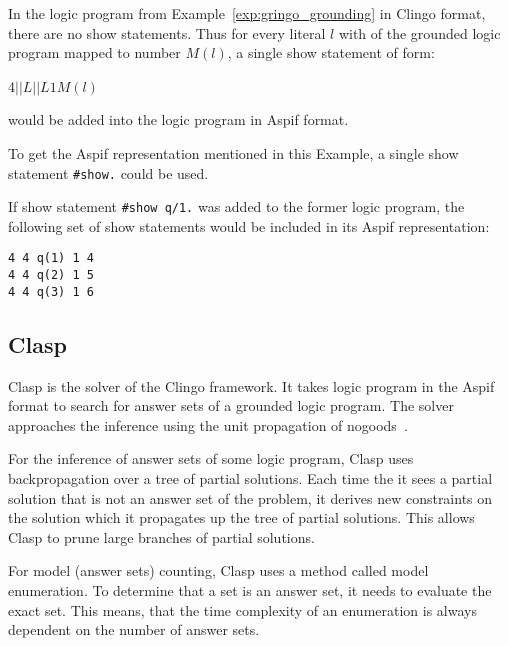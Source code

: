 \begin{example}
    In the logic program from Example~\ref{exp:gringo_grounding} in Clingo format,
    there are no show statements. Thus for every literal $l$ with of the grounded
    logic program mapped to number $M(l)$, a single show statement of form:
    \begin{center}
        4\ms{}$||L||$\ms{}$L$\ms{}$1$\ms{}$M(l)$
    \end{center}
    would be added into the logic program in Aspif format.

    To get the Aspif representation mentioned in this Example,
    a single show statement \texttt{\#show.} could be used.

    If show statement \texttt{\#show q/1.} was added to the former logic program,
    the following set of show statements would be included in its Aspif
    representation:
    \begin{lstlisting}[firstnumber=26]
4 4 q(1) 1 4
4 4 q(2) 1 5
4 4 q(3) 1 6
\end{lstlisting}
\end{example}

\subsection{Clasp}

Clasp is the solver of the Clingo framework. It takes logic program in the Aspif
format to search for answer sets of a grounded logic program.
The solver approaches the inference using the unit propagation
of nogoods~\cite{DBLP:journals/ai/GebserKS12}.

For the inference of answer sets of some logic program,
Clasp uses backpropagation over a tree of partial solutions.
Each time the it sees a partial solution that is not an answer set
of the problem, it derives new constraints on the solution which it
propagates up the tree of partial solutions. This allows Clasp
to prune large branches of partial solutions.

For model (answer sets) counting, Clasp uses a method
called model enumeration. To determine that a set is an answer set,
it needs to evaluate the exact set. This means, that the time complexity
of an enumeration is always dependent on the number of answer sets.
